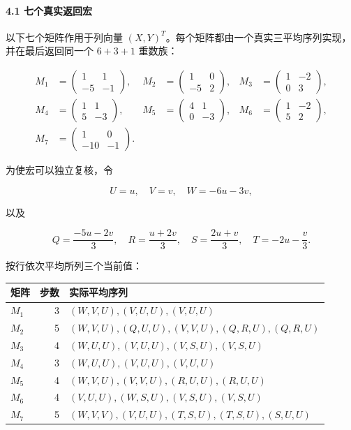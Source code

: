 \documentclass[11pt,a4paper]{article}
\theoremstyle{definition}
\numberwithin{equation}{section}
\begin{document}
\paragraph*{\texorpdfstring{{4.1} {七个真实返回宏}}{4.1 七个真实返回宏}}\label{C35-h237}

{以下七个矩阵作用于列向量} \((X,Y)^T\){。每个矩阵都由一个真实三平均序列实现，并在最后返回同一个} \(6+3+1\) {重数族：}

\[
\begin{aligned}
M_1&=\begin{pmatrix}1&1\\-5&-1\end{pmatrix},&
M_2&=\begin{pmatrix}1&0\\-5&2\end{pmatrix},&
M_3&=\begin{pmatrix}1&-2\\0&3\end{pmatrix},\\
M_4&=\begin{pmatrix}1&1\\5&-3\end{pmatrix},&
M_5&=\begin{pmatrix}4&1\\0&-3\end{pmatrix},&
M_6&=\begin{pmatrix}1&-2\\5&2\end{pmatrix},\\
M_7&=\begin{pmatrix}1&0\\-10&-1\end{pmatrix}.&&
\end{aligned}
\]

{为使宏可以独立复核，令}

\[
U=u,\quad V=v,\quad W=-6u-3v,
\]

{以及}

\[
Q=\frac{-5u-2v}{3},\quad
R=\frac{u+2v}{3},\quad
S=\frac{2u+v}{3},\quad
T=-2u-\frac v3.
\]

{按行依次平均所列三个当前值：}

{ %
\begin{longtable}[]{@{}lrl@{}}
\toprule\noalign{}
{矩阵} & {步数} & {实际平均序列} \\
\midrule\noalign{}
\endhead
\bottomrule\noalign{}
\endlastfoot
\(M_1\) & {3} & \((W,V,U),(V,U,U),(V,U,U)\) \\
\(M_2\) & {5} & \((W,V,U),(Q,U,U),(V,V,U),(Q,R,U),(Q,R,U)\) \\
\(M_3\) & {4} & \((W,U,U),(V,U,U),(V,S,U),(V,S,U)\) \\
\(M_4\) & {3} & \((W,U,U),(V,U,U),(V,U,U)\) \\
\(M_5\) & {4} & \((W,V,U),(V,V,U),(R,U,U),(R,U,U)\) \\
\(M_6\) & {4} & \((V,U,U),(W,S,U),(V,S,U),(V,S,U)\) \\
\(M_7\) & {5} & \((W,V,V),(V,U,U),(T,S,U),(T,S,U),(S,U,U)\) \\
\end{longtable}
}
\end{document}
